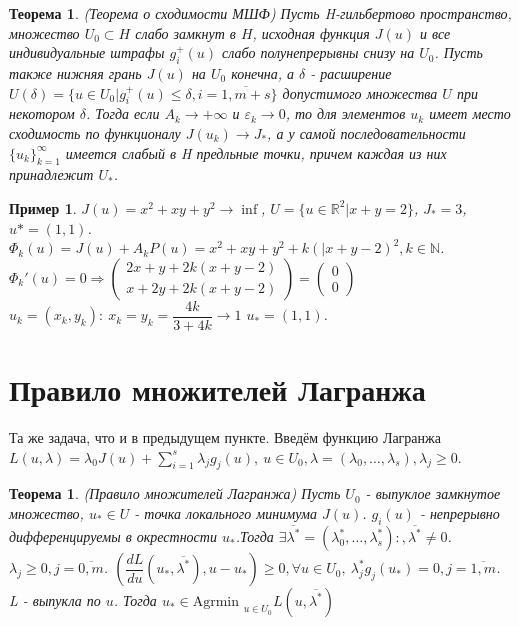 \documentclass[9pt, a4paper]{extarticle}
\newtheorem*{theorem*}{Теорема}
\newtheorem*{theorem}{Теорема}
\newtheorem*{sample}{Пример}
\begin{document}
	\begin{theorem*}
		(Теорема о сходимости МШФ)\newline
		Пусть H-гильбертово пространство, множество $U_0 \subset H$ слабо замкнут в $H$, исходная функция $J(u)$ и все индивидуальные штрафы $g_i^+(u)$ слабо полунепрерывны снизу на $U_0$. Пусть также нижняя грань $J(u)$ на $U_0$ конечна, а $\delta$ - расширение $U(\delta) = \{u\in U_0 \vert g_i^+(u) \leq \delta , i =\overline{1, m+s}\}$ допустимого множества  $U$ при некотором $\delta$. Тогда если $A_k \to +\infty$ и $ \varepsilon_k \to 0$, то для элементов $u_k$ имеет место сходимость по функционалу $J(u_k) \to J_*$, а у самой последовательности $\{u_k\}_{k=1}^\infty$ имеется слабый в H предльные точки, причем каждая из них принадлежит $U_*$. 
	\end{theorem*}
	\begin{sample}
		$J(u) = x^2 + xy + y^2  \to \inf$, $U = \{u \in \mathbb{R}^2 \vert x+y=2\}$, $J_* =3$, $u* = (1,1)$. \newline
		$\Phi_k(u) = J(u) + A_kP(u) = x^2 +xy+y^2 + k (|x+y-2)^2, k \in \mathbb{N}$. \newline
		$\Phi_k'(u) = 0 \Rightarrow \left(\begin{matrix}
			2x+y+2k(x+y-2)\\
			x+2y+2k(x+y-2)
		\end{matrix}\right) = \left(\begin{matrix}
		0\\ 0
		\end{matrix}\right)$\newline
		$u_k =(x_k, y_k): \ x_k= y_k= \dfrac{4k}{3+4k}\to 1$ $u_* = (1,1)$.
	\end{sample}
\section{Правило множителей Лагранжа}
 	Та же задача, что и в предыдущем пункте. \newline
 	Введём функцию Лагранжа $L(u, \lambda) = \lambda_0 J(u) + \sum\limits_{i=1}^s \lambda_j g_j(u), \ u \in U_0, \lambda = (\lambda_0, \dots, \lambda_s), \lambda_j \geq 0$. 
 	
	\begin{theorem}
		(Правило множителей Лагранжа)\newline
		Пусть $U_0$ - выпуклое замкнутое множество, $u_* \in U$ - точка локального минимума $J(u)$. $g_i(u)$ - непрерывно дифференцируемы в окрестности $u_*$.Тогда $\exists \overline{\lambda^*} = (\lambda_0^*, \dots, \lambda_s^*): ,  \overline{\lambda^*} \neq 0$. $\lambda_j \geq 0, j = \overline{0,m}$. $(\dfrac{dL}{du}(u_*,  \overline{\lambda^*}) , u - u_*) \geq 0, \forall u \in U_0, \ \lambda_j^*g_j(u_*) = 0, j = \overline{1, m}$. L - выпукла по $u$. Тогда $u_* \in \text{Agrmin }_{u \in U_0} L(u,  \overline{\lambda^*})$
	\end{theorem}
\end{document}
